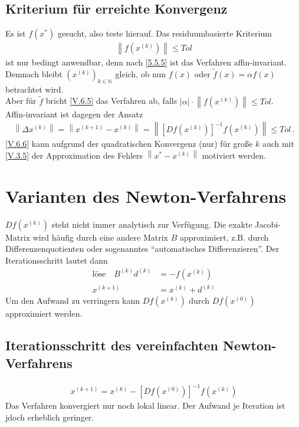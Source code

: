 \documentclass[ngerman,fontsize=11pt, paper=a4, parskip=half, titlepage=true, toc=bib]{scrbook}
\newcommand{\N}{\mathds{N}}
\newcommand{\nn}[1]{\left\| #1 \right\|}
\newcommand{\sectione}[1]{\section{#1} \setcounter{equation}{0}}
\begin{document}
  
  \subsection{Kriterium für erreichte Konvergenz}
  Es ist $f(x^{*})$ gesucht, also teste hierauf. Das residuumbasierte Kriterium
  \begin{gather}
    \nn{f(x^{(k)})}\leq Tol
    \label{V.6.5}
  \end{gather}
  ist nur bedingt anwendbar, denn nach \ref{5.5.5} ist das Verfahren affin-invariant.
  Demnach bleibt $(x^{(k)})_{k\in\N}$ gleich,
  ob nun $f(x)$ oder $\widetilde{f}(x) =\alpha f(x) $ betrachtet wird.\\
  Aber für $\widetilde{f}$ bricht \eqref{V.6.5} das Verfahren ab, 
  falls $|\alpha|\cdot \nn{f(x^{(k)})} \leq Tol$. \\
  Affin-invariant ist dagegen der Ansatz
  \begin{gather}
    \nn{\Delta x^{(k)}}= \nn{x^{(k+1)}-x^{(k)}} 
    = \nn{[Df(x^{(k)})]^{-1}f(x^{(k)})} 
    \leq Tol \, .
    \label{V.6.6}
  \end{gather}
  \eqref{V.6.6} kann aufgrund der quadratischen Konvergenz (nur) für 
  große $k$ auch mit \eqref{V.3.5} der Approximation des Fehlers 
  $\nn{x^{*}-x^{(k)}} $ motiviert werden.
  
  
  \sectione{Varianten des Newton-Verfahrens}
  $Df(x^{(k)})$ steht nicht immer analytisch zur Verfügung.
  Die exakte Jacobi-Matrix wird häufig durch eine andere Matrix $B$ approximiert, 
  z.B. durch Differenzenquotienten oder sogenanntes
  \enquote{automatisches Differenzieren}.
  Der Iterationsschritt lautet dann
  \begin{align}
    \text{löse}\quad B^{(k)}d^{(k)} &= -f(x^{(k)}) 
                                      \label{V.7.1} \\\nonumber
    x^{(k+1)} &=x^{(k)} + d^{(k)}
  \end{align}
  Um den Aufwand zu verringern kann $Df(x^{(k)})$ durch
  $Df(x^{(0)})$ approximiert werden.
  
  
  \subsection{Iterationsschritt des vereinfachten Newton-Verfahrens}
  \begin{gather}
    x^{(k+1)} = x^{(k)} -[Df(x^{(0)})]^{-1} f(x^{(k)})
    \label{V.7.2}
  \end{gather}
  Das Verfahren konvergiert nur noch lokal linear.
  Der Aufwand je Iteration ist jdoch erheblich geringer.
  
\end{document}
